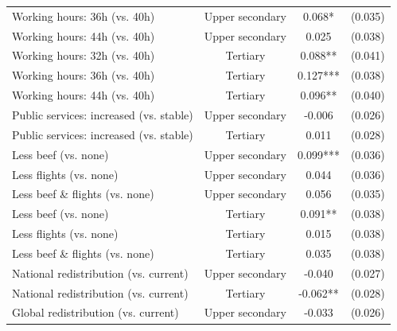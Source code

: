 \begin{table}[H]
\begin{tabular}{ l c c c }
\hspace{0.05cm} Working hours: 36h (vs. 40h) & Upper secondary & 0.068* & (0.035) \\
\hspace{0.05cm} Working hours: 44h (vs. 40h) & Upper secondary & 0.025 & (0.038) \\
\hspace{0.05cm} Working hours: 32h (vs. 40h) & Tertiary & 0.088** & (0.041) \\
\hspace{0.05cm} Working hours: 36h (vs. 40h) & Tertiary & 0.127*** & (0.038) \\
\hspace{0.05cm} Working hours: 44h (vs. 40h) & Tertiary & 0.096** & (0.040) \\
\hspace{0.05cm} Public services: increased (vs. stable) & Upper secondary & -0.006 & (0.026) \\
\hspace{0.05cm} Public services: increased (vs. stable) & Tertiary & 0.011 & (0.028) \\
\hspace{0.05cm} Less beef (vs. none) & Upper secondary & 0.099*** & (0.036) \\
\hspace{0.05cm} Less flights (vs. none) & Upper secondary & 0.044 & (0.036) \\
\hspace{0.05cm} Less beef \& flights (vs. none) & Upper secondary & 0.056 & (0.035) \\
\hspace{0.05cm} Less beef (vs. none) & Tertiary & 0.091** & (0.038) \\
\hspace{0.05cm} Less flights (vs. none) & Tertiary & 0.015 & (0.038) \\
\hspace{0.05cm} Less beef \& flights (vs. none) & Tertiary & 0.035 & (0.038) \\
\hspace{0.05cm} National redistribution (vs. current) & Upper secondary & -0.040 & (0.027) \\
\hspace{0.05cm} National redistribution (vs. current) & Tertiary & -0.062** & (0.028) \\
\hspace{0.05cm} Global redistribution (vs. current) & Upper secondary & -0.033 & (0.026) \\

\end{tabular}
\end{table}
